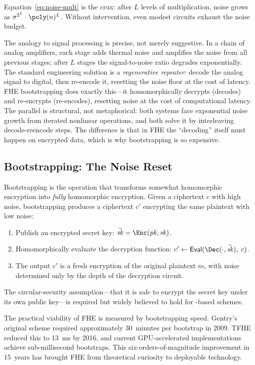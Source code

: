 Equation~\eqref{eq:noise-mult} is the crux: after $L$ levels of multiplication, noise grows as $\sigma^{2^L}\cdot\poly(n)^L$.  Without intervention, even modest circuits exhaust the noise budget.

The analogy to signal processing is precise, not merely suggestive.  In a chain of analog amplifiers, each stage adds thermal noise and amplifies the noise from all previous stages; after $L$ stages the signal-to-noise ratio degrades exponentially.  The standard engineering solution is a \emph{regenerative repeater}: decode the analog signal to digital, then re-encode it, resetting the noise floor at the cost of latency.  FHE bootstrapping does exactly this---it homomorphically decrypts (decodes) and re-encrypts (re-encodes), resetting noise at the cost of computational latency.  The parallel is structural, not metaphorical: both systems face exponential noise growth from iterated nonlinear operations, and both solve it by interleaving decode-reencode steps.  The difference is that in FHE the ``decoding'' itself must happen on encrypted data, which is why bootstrapping is so expensive.


\subsection{Bootstrapping: The Noise Reset}
\label{subsec:bootstrapping}

Bootstrapping is the operation that transforms somewhat homomorphic encryption into \emph{fully} homomorphic encryption.  Given a ciphertext $c$ with high noise, bootstrapping produces a ciphertext $c'$ encrypting the same plaintext with low noise:

\begin{enumerate}
\item Publish an encrypted secret key: $\widetilde{\mathit{sk}} = \Enc(\mathit{pk}, \mathit{sk})$.
\item Homomorphically evaluate the decryption function: $c' \leftarrow \mathsf{Eval}(\Dec(\cdot, \widetilde{\mathit{sk}}),\; c)$.
\item The output $c'$ is a fresh encryption of the original plaintext $m$, with noise determined only by the depth of the decryption circuit.
\end{enumerate}

The circular-security assumption---that it is safe to encrypt the secret key under its own public key---is required but widely believed to hold for \lwe{}-based schemes.

\begin{example}
\label{ex:bootstrap-progress}
The practical viability of FHE is measured by bootstrapping speed.  Gentry's original scheme required approximately 30~minutes per bootstrap in 2009.  TFHE reduced this to 13~ms by 2016, and current GPU-accelerated implementations achieve sub-millisecond bootstraps.  This six-orders-of-magnitude improvement in 15~years has brought FHE from theoretical curiosity to deployable technology.
\end{example}


